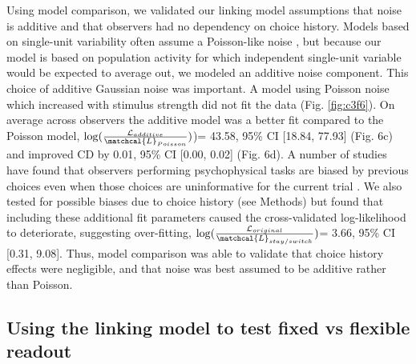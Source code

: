 Using model comparison, we validated our linking model assumptions that noise is additive and that observers had no dependency on choice history. Models based on single-unit variability often assume a Poisson-like noise \citep{Softky1993-ki}, but because our model is based on population activity for which independent single-unit variable would be expected to average out, we modeled an additive noise component. This choice of additive Gaussian noise was important. A model using Poisson noise which increased with stimulus strength did not fit the data (Fig. \ref{fig:c3f6}). On average across observers the additive model was a better fit compared to the Poisson model, $\log(\frac{\mathcal{L}_{additive}}{\matchcal{L}_{Poisson}})$)= 43.58, 95\% CI [18.84, 77.93] (Fig. 6c) and improved CD by 0.01, 95\% CI [0.00, 0.02] (Fig. 6d). A number of studies have found that observers performing psychophysical tasks are biased by previous choices even when those choices are uninformative for the current trial \citep{Abrahamyan2016-od,Frund2014-kh}. We also tested for possible biases due to choice history (see Methods) but found that including these additional fit parameters caused the cross-validated log-likelihood to deteriorate, suggesting over-fitting, $\log(\frac{\mathcal{L}_{original}}{\matchcal{L}_{stay/switch}})$= 3.66, 95\% CI [0.31, 9.08]. Thus, model comparison was able to validate that choice history effects were negligible, and that noise was best assumed to be additive rather than Poisson.

\subsection{Using the linking model to test fixed vs flexible readout}

